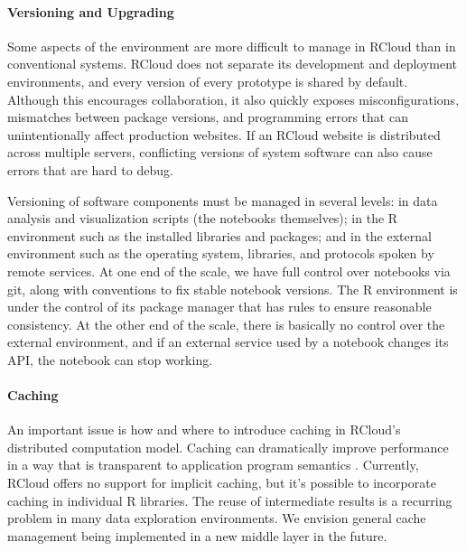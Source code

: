 \paragraph*{Versioning and Upgrading}
Some aspects of the environment are more difficult to
manage in RCloud than in conventional systems. RCloud does not separate
its development and deployment environments, and every version of every
prototype is shared by default. Although this encourages
collaboration, it also quickly exposes misconfigurations,
mismatches between package versions, and programming errors
that can unintentionally affect production websites.
If an RCloud website is distributed across multiple servers,
conflicting versions of system software
can also cause errors that are hard to debug.

Versioning of software components must be managed in several
levels: in data analysis and visualization scripts (the
notebooks themselves); in the R environment such as the installed
libraries and packages; and in the external environment such as the
operating system, libraries, and protocols spoken by remote
services. At one end of the scale, we have full control over notebooks
via git, along with conventions to fix stable notebook versions.
The R environment is under the control of its package manager that
has rules to ensure reasonable consistency.
At the other end of the scale, there is basically no
control over the external environment, and if an external service 
used by a notebook changes its API, the notebook can stop working.


\paragraph*{Caching}
An important issue is how and where to introduce caching in
RCloud's distributed computation model. Caching can dramatically
improve performance in a way that is transparent to
application program semantics \cite{Callahan:2006:VVM, Guo:2010:TPI}.
Currently, RCloud offers no support for implicit caching, but 
it's possible to incorporate caching in individual R libraries.
The reuse of intermediate results is a recurring problem
in many data exploration environments.
We envision general cache management being implemented in a
new middle layer in the future.

